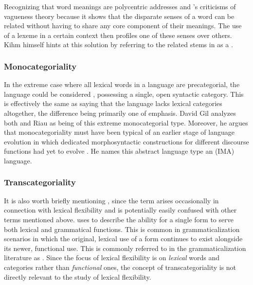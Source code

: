 Recognizing that word meanings are polycentric addresses \citeauthor{EvansOsada2005} and \citeauthor{Kihm2017}'s criticisms of vagueness theory because it shows that the disparate senses of a word can be related without having to share any core component of their meanings. The use of a lexeme in a certain context then profiles one of these senses over others. Kihm himself hints at this solution by referring to the related  stems in  as a .

\subsubsection{Monocategoriality}
\label{sec:2.3.1.5}

In the extreme case where all lexical words in a language are precategorial, the language could be considered , possessing a single, open syntactic category. This is effectively the same as saying that the language lacks lexical categories altogether, the difference being primarily one of emphasis. David Gil analyzes both  \parencite*{Gil1995} and Riau  \parencite*{Gil1994} as being of this extreme monocategorial type. Moreover, he argues that monocategoriality must have been typical of an earlier stage of language evolution in which dedicated morphosyntactic constructions for different discourse functions had yet to evolve \parencites{Gil2005}{Gil2006}{Gil2012}. He names this abstract language type an  (IMA) language.

\subsubsection{Transcategoriality}
\label{sec:2.3.1.6}

It is also worth briefly mentioning , since the term arises occasionally in connection with lexical flexibility and is potentially easily confused with other terms mentioned above. \textcite{Robert2003} uses  to describe the ability for a single form to serve both lexical and grammatical functions. This is common in grammaticalization scenarios in which the original, lexical use of a form continues to exist alongside its newer, functional use. This is commonly referred to in the grammaticalization literature as  \parencite[118]{HopperTraugott2003}. Since the focus of lexical flexibility is on \emph{lexical} words and categories rather than \emph{functional} ones, the concept of transcategoriality is not directly relevant to the study of lexical flexibility.

